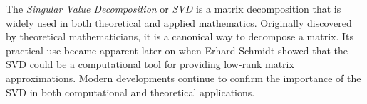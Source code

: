 
\label{lab:SVD}
%


The \emph{Singular Value Decomposition} or \emph{SVD} is a matrix decomposition that is widely used in both theoretical and applied mathematics.
Originally discovered by theoretical mathematicians, it is a canonical way to decompose a matrix.
Its practical use became apparent later on when Erhard Schmidt showed that the SVD could be a computational tool for providing low-rank matrix approximations.
Modern developments continue to confirm the importance of the SVD in both computational and theoretical applications.

